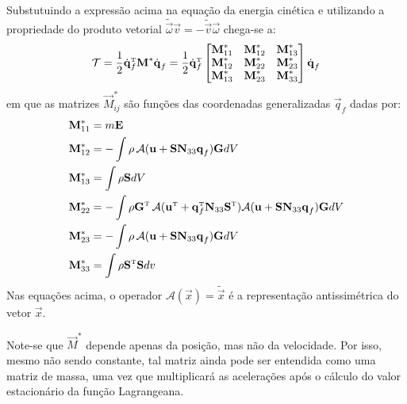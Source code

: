 Substutuindo a expressão acima na equação da energia cinética e utilizando a
propriedade do produto vetorial $\tilde{\vec{\omega}}\vec{v} = -
\tilde{\vec{v}}\vec{\omega}$ chega-se a:
\begin{align}
 \mathcal{T} = \frac{1}{2} \tp{\dot{\vec{q}}_f} {\vec{M}^*}
\dot{\vec{q}}_f = \frac{1}{2} \tp{\dot{\vec{q}}_f} \begin{bmatrix}
           \vec{M}^*_{11} & \vec{M}^*_{12} & \vec{M}^*_{13} \\
	   \vec{M}^*_{12} & \vec{M}^*_{22} & \vec{M}^*_{23} \\
           \vec{M}^*_{13} & \vec{M}^*_{23} & \vec{M}^*_{33}
           \end{bmatrix}
\dot{\vec{q}}_f
\end{align}
em que as matrizes $\vec{M}^*_{ij}$ são funções das coordenadas
generalizadas $\vec{q}_f$ dadas por:
\begin{align}
 \vec{M}^*_{11} &= m\vec{E} \\
 \vec{M}^*_{12} &= - \int{\rho \, \mathcal{A}({\vec{u} +
\vec{S}\vec{N}_{33}\vec{q}_f})\vec{G}dV} \\
 \vec{M}^*_{13} &= \int{\rho \vec{S} dV} \\
 \vec{M}^*_{22} &= - \int{\rho \tp{\vec{G}}
\,\mathcal{A}(\tp{\vec{u}} + \tp{\vec{q}}_f \vec{N}_{33}
\tp{\vec{S}}) \mathcal{A}(\vec{u} + \vec{S}\vec{N}_{33}\vec{q}_f)\vec{G}
dV} \\
 \vec{M}^*_{23} &= - \int{\rho \, \mathcal{A}(\vec{u} +
\vec{S}\vec{N}_{33}\vec{q}_f)\vec{G}dV} \\
 \vec{M}^*_{33} &= \int{\rho \tp{\vec{S}}\vec{S}dv}
\end{align}
Nas equações acima, o operador $\mathcal{A}(\vec{x}) = \tilde{\vec{x}}$ é a representação antissimétrica do vetor $\vec{x}$.

Note-se que ${\vec{M}^*}$ depende apenas da posição, mas não da
velocidade. Por isso, mesmo não sendo constante, tal matriz ainda pode ser entendida como uma matriz de massa, uma
vez que multiplicará as acelerações após o cálculo do valor estacionário da
função Lagrangeana.









